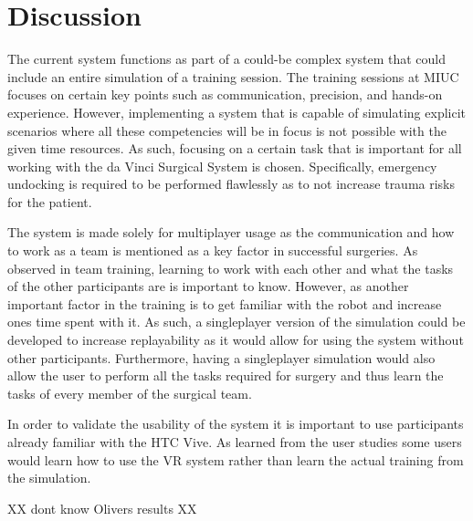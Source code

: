 \section{Discussion}
The current system functions as part of a could-be complex system that could include an entire simulation of a training session. The training sessions at MIUC focuses on certain key points such as communication, precision, and hands-on experience. However, implementing a system that is capable of simulating explicit scenarios where all these competencies will be in focus is not possible with the given time resources. As such, focusing on a certain task that is important for all working with the da Vinci Surgical System is chosen. Specifically, emergency undocking is required to be performed flawlessly as to not increase trauma risks for the patient.

The system is made solely for multiplayer usage as the communication and how to work as a team is mentioned as a key factor in successful surgeries. As observed in team training, learning to work with each other and what the tasks of the other participants are is important to know. However, as another important factor in the training is to get familiar with the robot and increase ones time spent with it. As such, a singleplayer version of the simulation could be developed to increase replayability as it would allow for using the system without other participants. Furthermore, having a singleplayer simulation would also allow the user to perform all the tasks required for surgery and thus learn the tasks of every member of the surgical team.

In order to validate the usability of the system it is important to use participants already familiar with the HTC Vive. As learned from the user studies some users would learn how to use the VR system rather than learn the actual training from the simulation.

XX dont know Olivers results XX